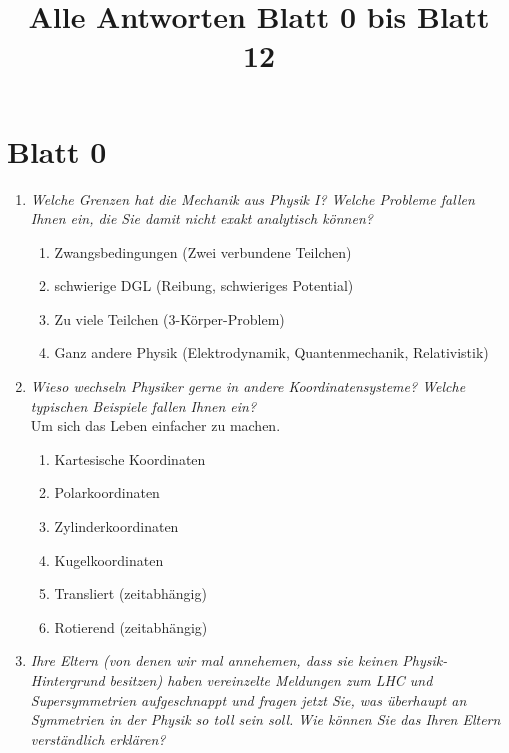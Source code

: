 

\subject{Kurzfragen}
\title{Alle Antworten Blatt 0 bis Blatt 12}
\date{%
}


    
\maketitle
\thispagestyle{empty}
\tableofcontents
\newpage

\section*{Blatt 0}
\begin{enumerate}
    \item \textit{Welche Grenzen hat die Mechanik aus Physik I? Welche Probleme fallen Ihnen ein, die Sie damit nicht exakt analytisch können?} 
            \begin{enumerate}
                \item Zwangsbedingungen (Zwei verbundene Teilchen)
                \item schwierige DGL (Reibung, schwieriges Potential)
                \item Zu viele Teilchen (3-Körper-Problem)
                \item Ganz andere Physik (Elektrodynamik, Quantenmechanik, Relativistik)
            \end{enumerate}
    \item \textit{Wieso wechseln Physiker gerne in andere Koordinatensysteme? Welche typischen Beispiele fallen Ihnen ein?} \\
            Um sich das Leben einfacher zu machen.
            \begin{enumerate}
                \item Kartesische Koordinaten
                \item Polarkoordinaten
                \item Zylinderkoordinaten
                \item Kugelkoordinaten
                \item Transliert (zeitabhängig)
                \item Rotierend (zeitabhängig)
            \end{enumerate}
    \item \textit{Ihre Eltern (von denen wir mal annehemen, dass sie keinen Physik-Hintergrund besitzen) haben vereinzelte Meldungen zum LHC und Supersymmetrien aufgeschnappt und fragen jetzt Sie, was überhaupt an Symmetrien in der Physik so toll sein soll. Wie können Sie das Ihren Eltern verständlich erklären?} \\

\end{enumerate}
